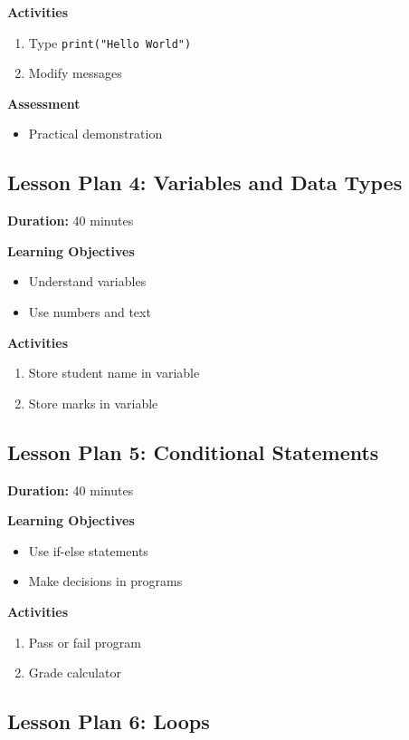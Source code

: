 \textbf{Activities}
\begin{enumerate}
    \item Type \texttt{print("Hello World")}
    \item Modify messages
\end{enumerate}

\textbf{Assessment}
\begin{itemize}
    \item Practical demonstration
\end{itemize}

\subsection*{Lesson Plan 4: Variables and Data Types}

\textbf{Duration:} 40 minutes

\textbf{Learning Objectives}
\begin{itemize}
    \item Understand variables
    \item Use numbers and text
\end{itemize}

\textbf{Activities}
\begin{enumerate}
    \item Store student name in variable
    \item Store marks in variable
\end{enumerate}

\subsection*{Lesson Plan 5: Conditional Statements}

\textbf{Duration:} 40 minutes

\textbf{Learning Objectives}
\begin{itemize}
    \item Use if-else statements
    \item Make decisions in programs
\end{itemize}

\textbf{Activities}
\begin{enumerate}
    \item Pass or fail program
    \item Grade calculator
\end{enumerate}

\subsection*{Lesson Plan 6: Loops}

